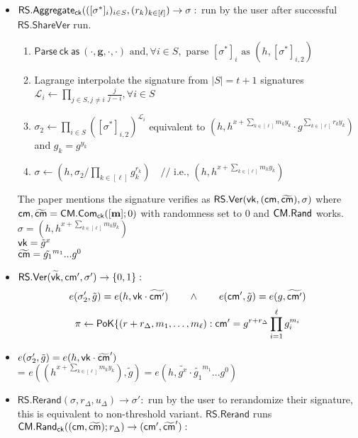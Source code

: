 \begin{itemize}
      \item $\mathsf{RS.Aggregate_{\mathsf{ck}}}(([\sigma^*]_i)_{i\in S}, (r_k)_{k\in[\ell]}) \to \sigma:$ run by the user after successful $\mathsf{RS.ShareVer}$ run. 
      \begin{enumerate}
          \item $\mathsf{Parse~ck~as~} (\cdot, \mathbf{g}, \cdot, \cdot) \text{ and}, \forall i \in S, \text{ parse } [\sigma^*]_i \text{ as } (h, [\sigma^*]_{i,2})$
          \item Lagrange interpolate the signature from $|S| = t+1$ signatures $\mathcal{L}_i \gets \prod_{j\in S, j\neq i} \frac{j}{j-i}, \forall i \in S$
          \item $\sigma_2 \gets \prod_{i\in S} ([\sigma^*]_{i,2})^{\mathcal{L}_i}$ equivalent to $(h, h^{x+\sum_{k\in[\ell]} m_k y_k} \cdot g^{\sum_{k\in[\ell]} r_k y_k})$ and $g_k = g^{y_k}$
          \item $\sigma \gets (h, \sigma_2/\prod_{k\in[\ell]} g_k^{r_k}) \quad \text{// i.e., } (h, h^{x+\sum_{k\in[\ell]} m_k y_k})$ 
      \end{enumerate}

      The paper mentions the signature verifies as $\mathsf{RS.Ver}(\mathsf{vk}, (\mathsf{cm}, \widetilde{\mathsf{cm}}), \sigma)$ where $\mathsf{cm}, \widetilde{\mathsf{cm}} = \mathsf{CM.Com}_{\mathsf{ck}}([\textbf{m}];0)$ with randomness set to 0 and $\mathsf{CM.Rand}$ works.
      $\sigma = (h, h^{x+\sum_{k\in[\ell]} m_k y_k})$ \\
      $\mathsf{vk} = \tilde{g}^x$ \\
      $\widetilde{\mathsf{cm}} = \tilde{g_1}^{m_1}...g^0$ \\

      \item $\mathsf{RS.Ver}(\widetilde{\mathsf{vk}}, \mathsf{cm}', {\sigma}') \to \{0,1\}:$ 
           \[
           e(\sigma_2', \tilde{g}) = e(h, \mathsf{vk} \cdot \widetilde{\mathsf{cm}'}) \qquad \wedge \qquad  e(\mathsf{cm}', \tilde{g}) = e(g, \widetilde{\mathsf{cm}'}) 
           \]
           \[
            \pi \gets \mathsf{PoK}\{(r + r_\Delta, m_1,\ldots,m_\ell): \mathsf{cm}' = g^{r + r_\Delta} \prod_{i=1}^\ell g_i^{m_i}
            \]

      \item $e(\sigma_2', \tilde{g}) = e(h, \mathsf{vk} \cdot \widetilde{\mathsf{cm}}')$ \\
      = $e((h^{x+\sum_{k\in[\ell]} m_k y_k}), \tilde{g}) = e(h, \tilde{g^x} \cdot \tilde{g_1}^{m_1}...g^0)$
      
      

      \item $\mathsf{RS.Rerand}(\sigma, r_{\Delta}, u_{\Delta}) \to \sigma':$  run by the user to rerandomize their signature, this is equivalent to non-threshold variant. $\mathsf{RS.Rerand}$ runs $\mathsf{CM.Rand}_{\mathsf{ck}}((\mathsf{cm}, \widetilde{\mathsf{cm}}); r_\Delta) \to (\mathsf{cm}', \widetilde{\mathsf{cm}}'): $ 
\end{itemize}
